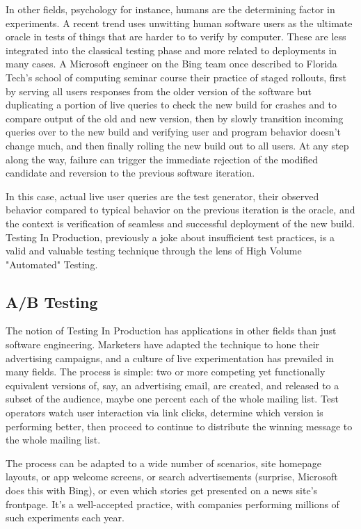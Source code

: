In other fields, psychology for instance, humans are the determining factor in experiments. A recent trend uses unwitting human software users as the ultimate oracle in tests of things that are harder to to verify by computer. These are less integrated into the classical testing phase and more related to deployments in many cases. A Microsoft engineer on the Bing team once described to Florida Tech's school of computing seminar course their practice of staged rollouts, first by serving all users responses from the older version of the software but duplicating a portion of live queries to check the new build for crashes and to compare output of the old and new version, then by slowly transition incoming queries over to the new build and verifying user and program behavior doesn't change much, and then finally rolling the new build out to all users. At any step along the way, failure can trigger the immediate rejection of the modified candidate and reversion to the previous software iteration.

In this case, actual live user queries are the test generator, their observed behavior compared to typical behavior on the previous iteration is the oracle, and the context is verification of seamless and successful deployment of the new build. Testing In Production, previously a joke about insufficient test practices, is a valid and valuable testing technique through the lens of High Volume "Automated" Testing.

\subsection{A/B Testing}
The notion of Testing In Production has applications in other fields than just software engineering. Marketers have adapted the technique to hone their advertising campaigns, and a culture of live experimentation has prevailed in many fields. The process is simple: two or more competing yet functionally equivalent versions of, say, an advertising email, are created, and released to a subset of the audience, maybe one percent each of the whole mailing list. Test operators watch user interaction via link clicks, determine which version is performing better, then proceed to continue to distribute the winning message to the whole mailing list.

The process can be adapted to a wide number of scenarios, site homepage layouts, or app welcome screens, or search advertisements (surprise, Microsoft does this with Bing), or even which stories get presented on a news site's frontpage. It's a well-accepted practice, with companies performing millions of such experiments each year. \citep{HBR2017ABTest}


